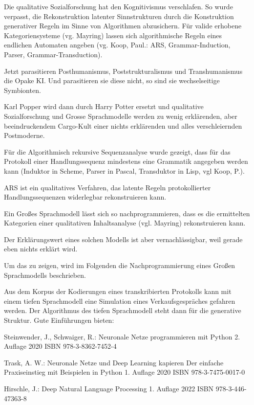 \documentclass[12pt]{article}
\begin{document}
Die qualitative Sozialforschung hat den Kognitivismus verschlafen.
So wurde verpasst, die Rekonstruktion latenter Sinnstrukturen
durch die Konstruktion generativer Regeln im Sinne von Algorithmen abzusichern. 
Für valide erhobene Kategoriensysteme (vg. Mayring) lassen sich algorithmische Regeln 
eines endlichen Automaten angeben 
(vg. Koop, Paul.: ARS, Grammar-Induction, Parser, Grammar-Transduction).

Jetzt parasitieren Posthumanismus, Poststrukturalismus und Transhumanismus die Opake KI.
Und parasitieren sie diese nicht, so sind sie wechselseitige Symbionten.

Karl Popper wird dann durch Harry Potter ersetzt und 
qualitative Sozialforschung und Grosse Sprachmodelle werden zu wenig erklärenden,
aber beeindruckendem Cargo-Kult einer nichts erklärenden und alles 
verschleiernden Postmoderne.

Für die Algorithmisch rekursive Sequenzanalyse wurde gezeigt,
dass für das Protokoll einer Handlungssequenz
mindestens eine Grammatik angegeben werden kann
(Induktor in Scheme, Parser in Pascal, Transduktor in Lisp, vgl Koop, P.).

ARS ist ein qualitatives Verfahren, 
das latente Regeln protokollierter Handlungssequenzen
widerlegbar rekonstruieren kann.

Ein Großes Sprachmodell lässt sich so nachprogrammieren, dass es die 
ermittelten Kategorien einer qualitativen Inhaltsanalyse (vgl. Mayring) 
rekonstruieren kann.

Der Erklärungswert eines solchen Modells ist aber vernachlässigbar, 
weil gerade eben nichts erklärt wird.

Um das zu zeigen, wird im Folgenden 
die Nachprogrammierung eines Großen Sprachmodells beschrieben.


Aus dem Korpus der Kodierungen eines transkribierten Protokolls kann mit einem tiefen Sprachmodell
eine Simulation eines Verkaufsgespräches gefahren werden. 
Der Algorithmus des tiefen Sprachmodell steht dann für die generative Struktur.
Gute Einführungen bieten:
    
Steinwender, J., Schwaiger, R.:
Neuronale Netze programmieren mit Python
2. Auflage 2020
ISBN 978-3-8362-7452-4

Trask, A. W.:
Neuronale Netze und Deep Learning kapieren
Der einfache Praxiseinstieg mit Beispielen in Python
1. Auflage 2020
ISBN 978-3-7475-0017-0

Hirschle, J.:
Deep Natural Language Processing
1. Auflage 2022
ISBN 978-3-446-47363-8
\end{document}
